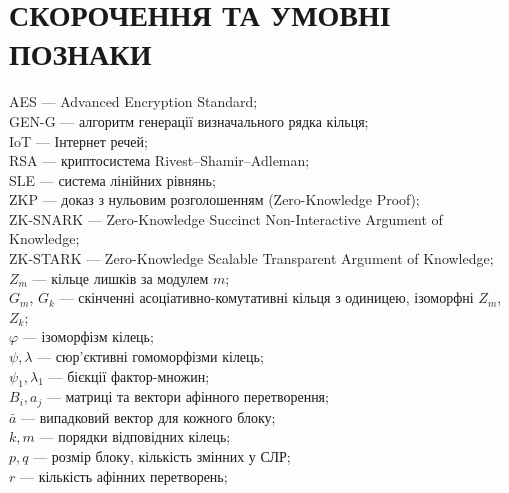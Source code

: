 \chapter*{СКОРОЧЕННЯ ТА УМОВНІ ПОЗНАКИ}
{}

\noindent
AES --- Advanced Encryption Standard; \\
GEN-G --- алгоритм генерації визначального рядка кільця; \\
IoT --- Інтернет речей; \\
RSA --- криптосистема Rivest–Shamir–Adleman; \\
SLE --- система лінійних рівнянь; \\
ZKP --- доказ з нульовим розголошенням (Zero-Knowledge Proof); \\
ZK-SNARK --- Zero-Knowledge Succinct Non-Interactive Argument of Knowledge; \\
ZK-STARK --- Zero-Knowledge Scalable Transparent Argument of Knowledge; \\
$Z_m$ --- кільце лишків за модулем $m$; \\
$G_m$, $G_k$ --- скінченні асоціативно-комутативні кільця з одиницею, ізоморфні $Z_m$, $Z_k$; \\
$\varphi$ --- ізоморфізм кілець; \\
$\psi, \lambda$ --- сюр'єктивні гомоморфізми кілець; \\
$\psi_1, \lambda_1$ --- бієкції фактор-множин; \\
$B_i, a_j$ --- матриці та вектори афінного перетворення; \\
$\bar{a}$ --- випадковий вектор для кожного блоку; \\
$k, m$ --- порядки відповідних кілець; \\
$p, q$ --- розмір блоку, кількість змінних у СЛР; \\
$r$ --- кількість афінних перетворень; \\
